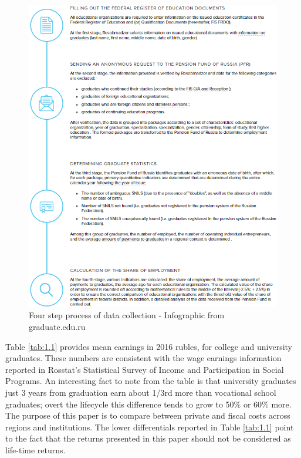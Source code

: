 \documentclass[alpha-refs]{wiley-article-05g}
\begin{document}
\begin{center}
	\begin{figure}[htbp!]
\begin{minipage}[b]{1\linewidth}
			\centering
			\hspace*{-0.2in}
         \includegraphics[scale=0.88, frame]{gedu_cap1b.png}
		\end{minipage}
			\caption{Four step process of data collection - Infographic from graduate.edu.ru}\label{fig:1.1}
	\end{figure}
\end{center}

\vspace{-0.35in}

Table \ref{tab:1.1} provides mean earnings in 2016 rubles, for college and university graduates. These numbers are consistent with the wage earnings information reported in Rosstat's Statistical Survey of Income and Participation in Social Programs. An interesting fact to note from the table is that university graduates just 3 years from graduation earn about 1/3rd more than vocational school graduates; overt the lifecycle this difference tends to grow to 50\% or 60\% more. The purpose of this paper is to compare between private and fiscal costs across regions and institutions. The lower differentials reported in Table \ref{tab:1.1} point to the fact that the returns presented in this paper should not be considered as life-time returns. 
\end{document}
